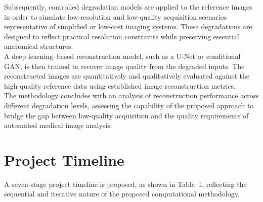 \documentclass[12pt,letterpaper]{article}     %
\begin{document}
\noindent Subsequently, controlled degradation models are applied to the reference images in order to simulate low-resolution and low-quality acquisition scenarios representative of simplified or low-cost imaging systems. These degradations are designed to reflect practical resolution constraints while preserving essential anatomical structures.\\

\noindent A deep learning–based reconstruction model, such as a U-Net or conditional GAN, is then trained to recover image quality from the degraded inputs. The reconstructed images are quantitatively and qualitatively evaluated against the high-quality reference data using established image reconstruction metrics.\\

\noindent The methodology concludes with an analysis of reconstruction performance across different degradation levels, assessing the capability of the proposed approach to bridge the gap between low-quality acquisition and the quality requirements of automated medical image analysis.




\section{Project Timeline}
A seven-stage project timeline is proposed, as shown in Table~1, reflecting the sequential and iterative nature of the proposed computational methodology.
\end{document}
